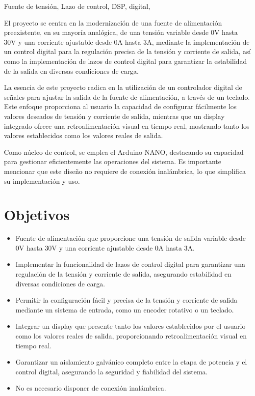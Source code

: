 
\begin{resumen}{Fuente de tensión, Lazo de control, DSP, digital,}

El proyecto se centra en la modernización de una fuente de alimentación preexistente, en su mayoría analógica, de una tensión variable desde 0V hasta 30V y una corriente ajustable desde 0A hasta 3A, mediante la implementación de un control digital para la regulación precisa de la tensión y corriente de salida, así como la implementación de lazos de control digital para garantizar la estabilidad de la salida en diversas condiciones de carga. 

La esencia de este proyecto radica en la utilización de un controlador digital de señales para ajustar la salida de la fuente de alimentación, a través de un teclado. Este enfoque proporciona al usuario la capacidad de configurar fácilmente los valores deseados de tensión y corriente de salida, mientras que un display integrado ofrece una retroalimentación visual en tiempo real, mostrando tanto los valores establecidos como los valores reales de salida.

Como núcleo de control, se emplea el Arduino NANO, destacando su capacidad para gestionar eficientemente las operaciones del sistema. Es importante mencionar que este diseño no requiere de conexión inalámbrica, lo que simplifica su implementación y uso.\par

\section*{Objetivos}

\begin{itemize}
    \item Fuente de alimentación que proporcione una tensión de salida variable desde 0V hasta 30V y una corriente ajustable desde 0A hasta 3A.
    \item Implementar la funcionalidad de lazos de control digital para garantizar una regulación de la tensión y corriente de salida, asegurando estabilidad en diversas condiciones de carga.
    \item Permitir la configuración fácil y precisa de la tensión y corriente de salida mediante un sistema de entrada, como un encoder rotativo o un teclado.
    \item Integrar un display que presente tanto los valores establecidos por el usuario como los valores reales de salida, proporcionando retroalimentación visual en tiempo real.
    \item Garantizar un aislamiento galvánico completo entre la etapa de potencia y el control digital, asegurando la seguridad y fiabilidad del sistema.
    \item No es necesario disponer de conexión inalámbrica.
\end{itemize}

\end{resumen}
